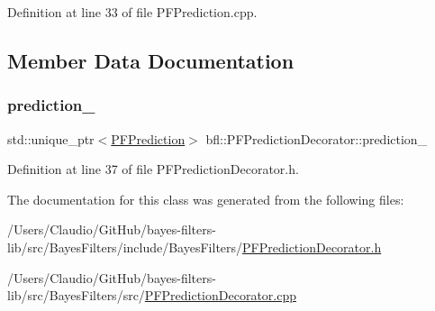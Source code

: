 Definition at line 33 of file P\+F\+Prediction.\+cpp.



\subsection{Member Data Documentation}
\mbox{\label{classbfl_1_1PFPredictionDecorator_a95f122f6fb7e69c436ae221c40d1c515}} 
\subsubsection{\texorpdfstring{prediction\+\_\+}{prediction\_}}
{\footnotesize\ttfamily std\+::unique\+\_\+ptr$<$\mbox{\hyperlink{classbfl_1_1PFPrediction}{P\+F\+Prediction}}$>$ bfl\+::\+P\+F\+Prediction\+Decorator\+::prediction\+\_\+\hspace{0.3cm}{\ttfamily [private]}}



Definition at line 37 of file P\+F\+Prediction\+Decorator.\+h.



The documentation for this class was generated from the following files\+:\begin{DoxyCompactItemize}
\item 
/\+Users/\+Claudio/\+Git\+Hub/bayes-\/filters-\/lib/src/\+Bayes\+Filters/include/\+Bayes\+Filters/\mbox{\hyperlink{PFPredictionDecorator_8h}{P\+F\+Prediction\+Decorator.\+h}}\item 
/\+Users/\+Claudio/\+Git\+Hub/bayes-\/filters-\/lib/src/\+Bayes\+Filters/src/\mbox{\hyperlink{PFPredictionDecorator_8cpp}{P\+F\+Prediction\+Decorator.\+cpp}}\end{DoxyCompactItemize}
